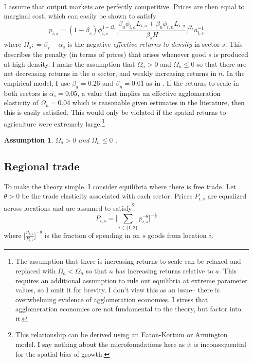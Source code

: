 \documentclass[]{article}
\theoremstyle{plain}
\newtheorem{assumption}{Assumption}
\begin{document}
\paragraph*{}
I assume that output markets are perfectly competitive. Prices are then equal to marginal cost, which can easily be shown to satisfy 
\begin{equation}\label{pindex}
p_{i,s} = (1-\beta_{s})\phi_{i,s}^{1-\Omega_{s}}\bigg[ \frac{\beta_{a}\phi_{i,a}L_{i, a} + \beta_{n}\phi_{i,n}L_{i, n}}{\beta_{s}H}\bigg]^{\Omega_{s}}a_{i,s}^{-1}
\end{equation}
where $\Omega_{s} : = \beta_{s} - \alpha_{s}$ is the negative \textit{effective returns to density} in sector $s$. This describes the penalty (in terms of prices) that arises whenever good $s$ is produced at high density. I make the assumption that $\Omega_{a} > 0$ and $\Omega_{n}  \leq 0$ so that there are net decreasing returns in the $a$ sector, and weakly increasing returns in $n$. In the empirical model, I use $\beta_{a} = 0.26$ and $\beta_{n} = 0.01$ as in \cite{hao2020}. If the returns to scale in both sectors is $\alpha_{s} = 0.05$, a value that implies an effective agglomeration elasticity of $\Omega_{n} = 0.04$ which is reasonable given estimates in the literature, then this is easily satisfied. This would only be violated if the spatial returns to agriculture were extremely large.\footnote{The assumption that there is increasing returns to scale can be relaxed and replaced with $\Omega_{a} < \Omega_{n}$ so that $n$ has increasing returns relative to $a$. This requires an additional assumption to rule out equilibria at extreme parameter values, so I omit it for brevity. I don't view this as an issue-- there is overwhelming evidence of agglomeration economies. I stress that agglomeration economies are not fundamental to the theory, but factor into it.} 
\begin{assumption}\label{assump:spatialreturns}
 $\Omega_{a} > 0$ and $\Omega_{n} \leq 0$ .
\end{assumption}

\subsection*{Regional trade}
To make the theory simple, I consider equilibria where there is free trade. Let $\theta > 0$ be the trade elasticity associated with each sector. Prices $P_{i, s}$ are equalized across locations and are assumed to satisfy\footnote{This relationship can be derived using an Eaton-Kortum or Armington model. I say nothing about the microfoundations here as it is inconsequential for the spatial bias of growth.}
\begin{equation*}
	P_{i, s} = \bigg[\sum_{i \in \{1, 2\}}p_{i, s}^{-\theta}\bigg]^{-\frac{1}{\theta}}
\end{equation*}
where $\bigg[\frac{p_{i, s}}{P_{i, s}}\bigg]^{-\theta}$ is the fraction of spending in on $s$ goods from location $i$.  
\end{document}
